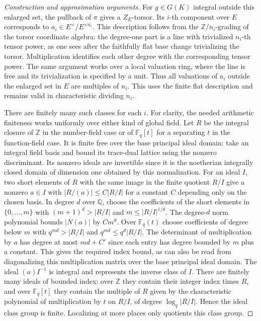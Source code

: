 \documentclass[11pt,a4paper,openany,oneside]{book}
\theoremstyle{resultstyle}
\theoremstyle{definition}
\numberwithin{equation}{chapter}
\newcommand{\ZZ}{\mathbb{Z}}
\newcommand{\FF}{\mathbb{F}}
\newcommand{\QQ}{\mathbb{Q}}
\begin{document}
\begin{proof}[Construction and approximation arguments]
For $g\in G(K)$ integral outside this enlarged set,
the pullback of $\pi$ gives a $Z_E$-torsor. Its
$i$-th component over $E$ corresponds to
$a_i\in E^\times/E^{\times n_i}$. This description follows
from the $\ZZ/n_i$-grading of the torsor coordinate algebra:
the degree-one part is a line with trivialized $n_i$-th
tensor power, as one sees after the faithfully flat
base change trivializing the torsor. Multiplication
identifies each other degree with the corresponding
tensor power. The same argument works over a local
valuation ring, where the line is free and its
trivialization is specified by a unit. Thus all
valuations of $a_i$ outside the enlarged set in $E$
are multiples of $n_i$. This uses the finite flat
description and remains valid in characteristic
dividing $n_i$.

There are finitely many such classes for each $i$.
For clarity, the needed arithmetic finiteness works
uniformly over either kind of global field. Let $R$
be the integral closure of $\ZZ$ in the number-field
case or of $\FF_q[t]$ for a separating $t$ in the
function-field case. It is finite free over the
base principal ideal domain: take an integral field
basis and bound its trace-dual lattice using the nonzero
discriminant. Its nonzero ideals are invertible since
it is the noetherian integrally closed domain of
dimension one obtained by this normalization.
For an ideal $I$, two short elements of $R$
with the same image in the finite quotient $R/I$
give a nonzero $a\in I$ with
$|R/(a)|\leq C|R/I|$ for a constant $C$ depending
only on the chosen basis. In degree $d$ over $\QQ$,
choose the coefficients of the short elements
in $\{0,\ldots,m\}$ with $(m+1)^d>|R/I|$ and
$m\leq |R/I|^{1/d}$. The degree-$d$ norm polynomial
bounds $|N(a)|$ by $Cm^d$. Over $\FF_q(t)$ choose
coefficients of degree below $m$ with
$q^{md}>|R/I|$ and $q^{md}\leq q^d|R/I|$.
The determinant of multiplication by $a$ has
degree at most $md+C'$ since each entry has degree
bounded by $m$ plus a constant. This gives the
required index bound, as can also be read from
diagonalizing this multiplication matrix over the
base principal ideal domain. The ideal $(a)I^{-1}$
is integral and represents the inverse class of $I$.
There are finitely many ideals of bounded index:
over $\ZZ$ they contain their integer index times
$R$, and over $\FF_q[t]$ they contain the multiple
of $R$ given by the characteristic polynomial of
multiplication by $t$ on $R/I$, of degree
$\log_q|R/I|$. Hence the ideal class group is finite.
Localizing at more places only quotients this class
group.


\end{proof}
\end{document}
